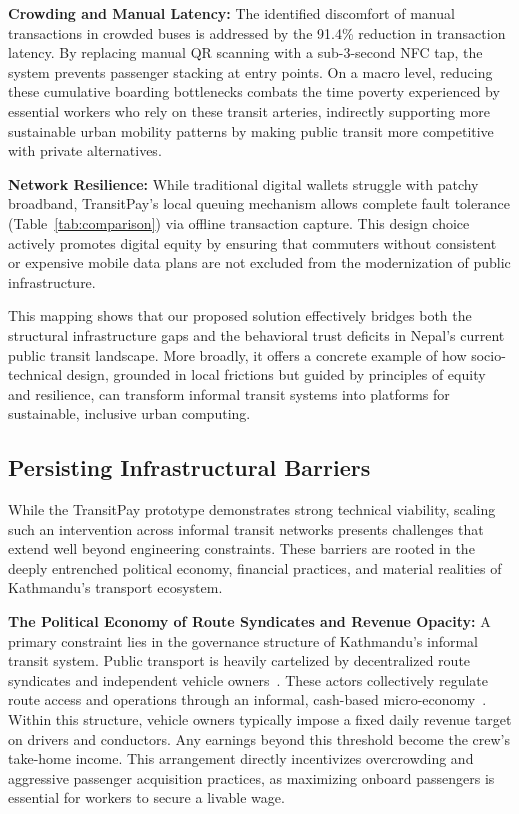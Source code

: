 \documentclass[manuscript,review,anonymous]{acmart}
\begin{document}
\textbf{Crowding and Manual Latency:} The identified discomfort of manual transactions in crowded buses is addressed by the 91.4\% reduction in transaction latency. By replacing manual QR scanning with a sub-3-second NFC tap, the system prevents passenger stacking at entry points. On a macro level, reducing these cumulative boarding bottlenecks combats the time poverty experienced by essential workers who rely on these transit arteries, indirectly supporting more sustainable urban mobility patterns by making public transit more competitive with private alternatives.

\textbf{Network Resilience:} While traditional digital wallets struggle with patchy broadband, TransitPay's local queuing mechanism allows complete fault tolerance (Table~\ref{tab:comparison}) via offline transaction capture. This design choice actively promotes digital equity by ensuring that commuters without consistent or expensive mobile data plans are not excluded from the modernization of public infrastructure.

This mapping shows that our proposed solution effectively bridges both the structural infrastructure gaps and the behavioral trust deficits in Nepal's current public transit landscape. More broadly, it offers a concrete example of how socio-technical design, grounded in local frictions but guided by principles of equity and resilience, can transform informal transit systems into platforms for sustainable, inclusive urban computing.

\subsection{Persisting Infrastructural Barriers}
While the TransitPay prototype demonstrates strong technical viability, scaling such an intervention across informal transit networks presents challenges that extend well beyond engineering constraints. These barriers are rooted in the deeply entrenched political economy, financial practices, and material realities of Kathmandu's transport ecosystem.

\textbf{The Political Economy of Route Syndicates and Revenue Opacity:} 
A primary constraint lies in the governance structure of Kathmandu's informal transit system. Public transport is heavily cartelized by decentralized route syndicates and independent vehicle owners~\cite{sharma2021passengers}. These actors collectively regulate route access and operations through an informal, cash-based micro-economy~\cite{worldbank2013kathmandu}. Within this structure, vehicle owners typically impose a fixed daily revenue target on drivers and conductors. Any earnings beyond this threshold become the crew’s take-home income. This arrangement directly incentivizes overcrowding and aggressive passenger acquisition practices, as maximizing onboard passengers is essential for workers to secure a livable wage.
\end{document}
